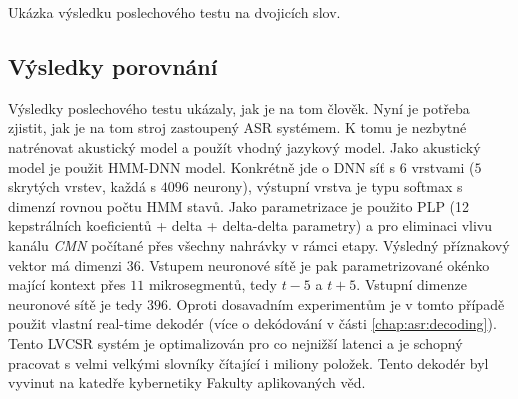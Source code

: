 \begin{table}[htpb]
  \centering
  \def\arraystretch{1.5}
  \caption{Ukázka výsledku poslechového testu na dvojicích slov.}
  \label{tab:realisation:listening:bigrams}
\end{table}

\subsection{Výsledky porovnání}
\label{chap:realisation:comparison}

Výsledky poslechového testu ukázaly, jak je na tom člověk. Nyní je potřeba zjistit, jak je na tom stroj zastoupený ASR systémem. K tomu je nezbytné natrénovat akustický model a použít vhodný jazykový model. Jako akustický model je použit HMM-DNN model. Konkrétně jde o DNN síť s $6$ vrstvami ($5$ skrytých vrstev, každá s $4096$ neurony), výstupní vrstva je typu softmax s dimenzí rovnou počtu HMM stavů. Jako parametrizace je použito PLP (12 kepstrálních koeficientů + delta + delta-delta parametry) a pro eliminaci vlivu kanálu \textit{CMN} počítané přes všechny nahrávky v rámci etapy. Výsledný příznakový vektor má dimenzi $36$. Vstupem neuronové sítě je pak parametrizované okénko mající kontext přes $11$ mikrosegmentů, tedy $t-5$ a $t+5$. Vstupní dimenze neuronové sítě je tedy $396$. Oproti dosavadním experimentům je v tomto případě použit vlastní real-time dekodér (více o dekódování v části \ref{chap:asr:decoding}). Tento LVCSR systém je optimalizován pro co nejnižší latenci a je schopný pracovat s velmi velkými slovníky čítající i miliony položek. Tento dekodér byl vyvinut na katedře kybernetiky Fakulty aplikovaných věd.

